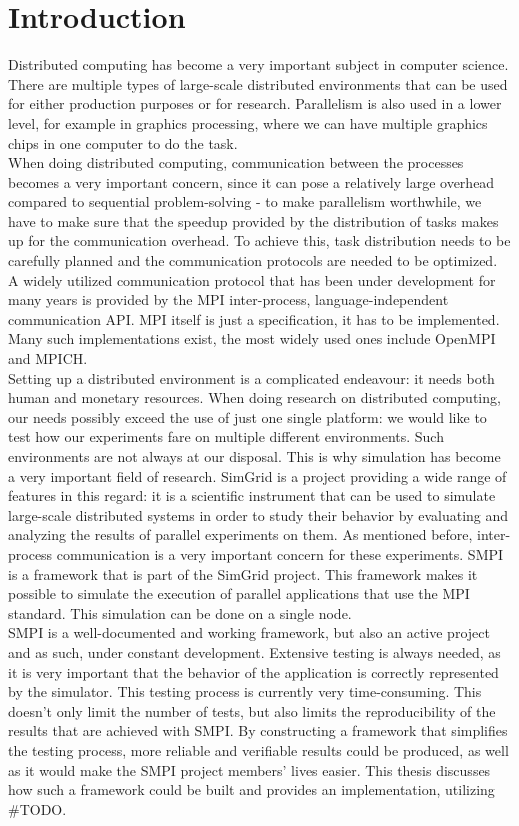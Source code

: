 
\chapter{Introduction}
\label{Chapter1}
Distributed computing has become a very important subject in computer
science. There are multiple types of large-scale distributed
environments that can be used for either production purposes or for
research. Parallelism is also used in a lower level, for example in
graphics processing, where we can have multiple graphics chips in one
computer to do the task.\\
When doing distributed computing, communication between the processes
becomes a very important concern, since it can pose a relatively large
overhead compared to sequential problem-solving - to make parallelism
worthwhile, we have to make sure that the speedup provided by the
distribution of tasks makes up for the communication overhead. To
achieve this, task distribution needs to be carefully planned and the
communication protocols are needed to be optimized. A widely utilized
communication protocol that has been under development for many years
is provided by the MPI\cite{mpif12} inter-process, language-independent
communication API. MPI itself is just a specification, it has to be
implemented. Many such implementations exist, the most widely used
ones include OpenMPI\cite{ompi04} and MPICH\cite{mpich12}.\\
Setting up a distributed environment is a complicated endeavour: it
needs both human and monetary resources. When doing research on
distributed computing, our needs possibly exceed the use of just one
single platform: we would like to test how our experiments fare on
multiple different environments. Such environments are not always at
our disposal. This is why simulation has become a very important field
of research. SimGrid\cite{clq08} is a project providing a wide range
of features in this regard: it is a scientific instrument that can be
used to simulate large-scale distributed systems in order to study
their behavior by evaluating and analyzing the results of parallel
experiments on them. As mentioned before, inter-process communication
is a very important concern for these experiments. SMPI is a framework
that is part of the SimGrid project. This framework makes it possible
to simulate the execution of parallel applications that use the MPI
standard. This simulation can be done on a single node.\\
SMPI is a well-documented and working framework, but also an active
project and as such, under constant development. Extensive testing is
always needed, as it is very important that the behavior of the
application is correctly represented by the simulator. This testing
process is currently very time-consuming. This doesn't only limit the
number of tests, but also limits the reproducibility of the results
that are achieved with SMPI. By constructing a framework that
simplifies the testing process, more reliable and verifiable results
could be produced, as well as it would make the SMPI project members'
lives easier. This thesis discusses how such a framework could be
built and provides an implementation, utilizing \#TODO.
